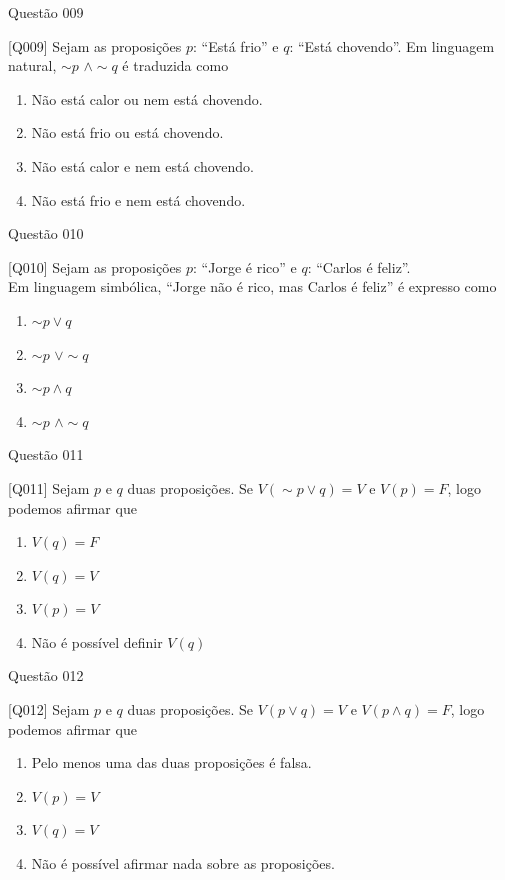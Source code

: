 \documentclass[xcolor=dvipsnames,table]{beamer}
\begin{document}
\begin{frame}{Questão 009}
\begin{block}{[Q009]}
	Sejam as proposições $p$: ``Está frio'' e $q$: ``Está chovendo''. Em linguagem natural, $\sim p$ $\wedge \sim q$ é traduzida como 
\end{block}
\begin{enumerate}[label=(\Alph*)]
	\item Não está calor ou nem está chovendo.
	\item Não está frio ou está chovendo.
	\item Não está calor e nem está chovendo.
	\item Não está frio e nem está chovendo.
\end{enumerate}
\end{frame}


\begin{frame}{Questão 010}
\begin{block}{[Q010]}
	Sejam as proposições $p$: ``Jorge é rico'' e $q$: ``Carlos é feliz''. \\Em linguagem simbólica, ``Jorge não é rico, mas Carlos é feliz'' é expresso como
\end{block}
\begin{enumerate}[label=(\Alph*)]
	\item $\sim p \vee q$
	\item $\sim p$ $\vee \sim q$
	\item $\sim p \wedge q$
	\item $\sim p$ $\wedge \sim q$
\end{enumerate}
\end{frame}

\begin{frame}{Questão 011}
\begin{block}{[Q011]}
	Sejam $p$ e $q$ duas proposições. Se $V(\sim p \vee q) = V$ e $V(p) = F$, logo podemos afirmar que
\end{block}

	\begin{enumerate}[label=(\Alph*)]
		\item $V(q) = F$
		\item $V(q) = V$
		\item $V(p) = V$
		\item Não é possível definir $V(q)$
	\end{enumerate}
\end{frame}

\begin{frame}{Questão 012}
\begin{block}{[Q012]}
	Sejam $p$ e $q$ duas proposições. Se $V(p \vee q) = V$ e $V(p \wedge q) = F$, logo podemos afirmar que
\end{block}

\begin{enumerate}[label=(\Alph*)]
	\item Pelo menos uma das duas proposições é falsa. 
	\item $V(p) = V$
	\item $V(q) = V$
	\item Não é possível afirmar nada sobre as proposições.
\end{enumerate}
\end{frame}
\end{document}
